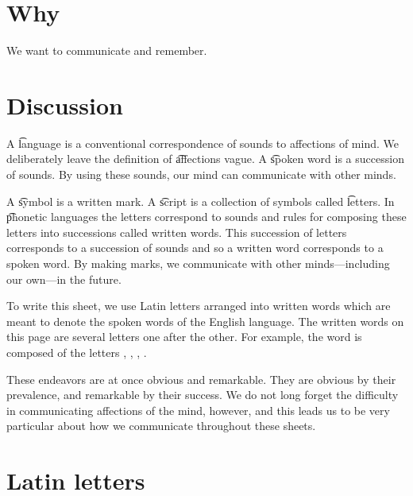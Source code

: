 

\section*{Why}

We want to communicate and remember.

\section*{Discussion}

A \t{language} is a conventional correspondence of sounds to affections of mind.
We deliberately leave the definition of \t{affections} vague.
A \t{spoken word} is a succession of sounds.
By using these sounds, our mind can communicate with other minds.

A \t{symbol} is a written mark.
A \t{script} is a collection of symbols called \t{letters}.
In \t{phonetic} languages the letters correspond to sounds and rules for composing these letters into successions called written words.
This succession of letters corresponds to a succession of sounds and so a written word corresponds to a spoken word.
By making marks, we communicate with other minds---including our own---in the future.

To write this sheet, we use Latin letters arranged into written words which are meant to denote the spoken words of the English language.
The written words on this page are several letters one after the other.
For example, the word  is composed of the letters , , , .

These endeavors are at once obvious and remarkable.
They are obvious by their prevalence, and remarkable by their success.
We do not long forget the difficulty in communicating affections of the mind, however, and this leads us to be very particular about how we communicate throughout these sheets.

\section*{Latin letters}

